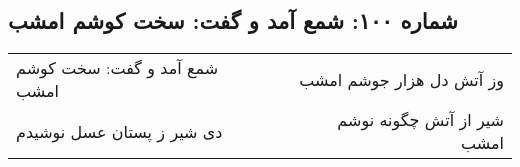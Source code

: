 \begin{center}
\section*{شماره ۱۰۰: شمع آمد و گفت: سخت کوشم امشب}
\label{sec:100}
\begin{longtable}{l p{0.5cm} r}
شمع آمد و گفت: سخت کوشم امشب
&&
وز آتش دل هزار جوشم امشب
\\
دی شیر ز پستان عسل نوشیدم
&&
شیر از آتش چگونه نوشم امشب
\\
\end{longtable}
\end{center}
